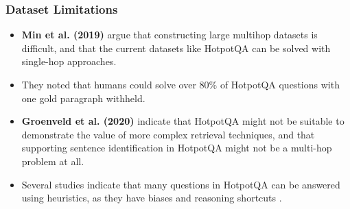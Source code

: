 \documentclass[10pt]{beamer}
\begin{document}
\begin{frame}
  \frametitle{Dataset Limitations}
  \begin{itemize}
    \item \textbf{Min et al. (2019)} \cite{RN150} argue that constructing large multihop datasets is difficult, and that the current datasets like HotpotQA can be solved with single-hop approaches. %
    \item They noted that humans could solve over 80\% of HotpotQA questions with one gold paragraph withheld.%
    \item \textbf{Groenveld et al. (2020)} \cite{RN126} indicate that HotpotQA might not be suitable to demonstrate the value of more complex retrieval techniques, and that supporting sentence identification in HotpotQA might not be a multi-hop problem at all.%
    \item Several studies \cite{RN154} \cite{RN176} \cite{RN150} \cite{RN175} indicate that many questions in HotpotQA can be answered using heuristics, 
    as they have biases and reasoning shortcuts \cite{RN177}.
  \end{itemize}
  
\end{frame}




\end{document}

